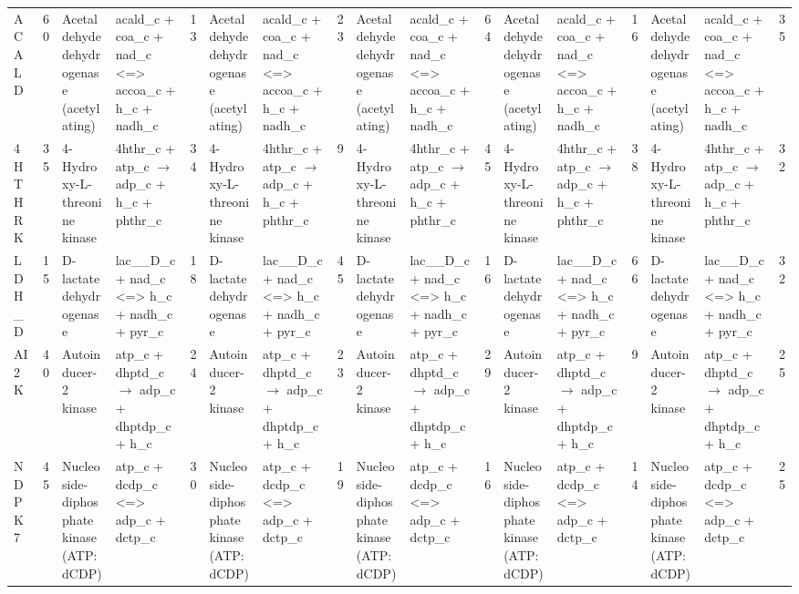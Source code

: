 \begin{tabular}{lrllrllrllrllrllr}
ACALD    & 60 &  Acetaldehyde dehydrogenase (acetylating) &  acald\_c + coa\_c + nad\_c <=> accoa\_c + h\_c + nadh\_c & 13 &  Acetaldehyde dehydrogenase (acetylating) &  acald\_c + coa\_c + nad\_c <=> accoa\_c + h\_c + nadh\_c & 23 &  Acetaldehyde dehydrogenase (acetylating) &  acald\_c + coa\_c + nad\_c <=> accoa\_c + h\_c + nadh\_c & 64 &  Acetaldehyde dehydrogenase (acetylating) &  acald\_c + coa\_c + nad\_c <=> accoa\_c + h\_c + nadh\_c & 16 &  Acetaldehyde dehydrogenase (acetylating) &  acald\_c + coa\_c + nad\_c <=> accoa\_c + h\_c + nadh\_c & 35 \\
4HTHRK   & 35 &  4-Hydroxy-L-threonine kinase &  4hthr\_c + atp\_c $\rightarrow$ adp\_c + h\_c + phthr\_c & 34 &  4-Hydroxy-L-threonine kinase &  4hthr\_c + atp\_c $\rightarrow$ adp\_c + h\_c + phthr\_c & 9 &  4-Hydroxy-L-threonine kinase &  4hthr\_c + atp\_c $\rightarrow$ adp\_c + h\_c + phthr\_c & 45 &  4-Hydroxy-L-threonine kinase &  4hthr\_c + atp\_c $\rightarrow$ adp\_c + h\_c + phthr\_c & 38 &  4-Hydroxy-L-threonine kinase &  4hthr\_c + atp\_c $\rightarrow$ adp\_c + h\_c + phthr\_c & 32 \\
LDH\_D    & 15 &  D-lactate dehydrogenase &  lac\_\_D\_c + nad\_c <=> h\_c + nadh\_c + pyr\_c & 18 &  D-lactate dehydrogenase &  lac\_\_D\_c + nad\_c <=> h\_c + nadh\_c + pyr\_c & 45 &  D-lactate dehydrogenase &  lac\_\_D\_c + nad\_c <=> h\_c + nadh\_c + pyr\_c & 16 &  D-lactate dehydrogenase &  lac\_\_D\_c + nad\_c <=> h\_c + nadh\_c + pyr\_c & 66 &  D-lactate dehydrogenase &  lac\_\_D\_c + nad\_c <=> h\_c + nadh\_c + pyr\_c & 32 \\
AI2K     & 40 &  Autoinducer-2 kinase &  atp\_c + dhptd\_c $\rightarrow$ adp\_c + dhptdp\_c + h\_c & 24 &  Autoinducer-2 kinase &  atp\_c + dhptd\_c $\rightarrow$ adp\_c + dhptdp\_c + h\_c & 23 &  Autoinducer-2 kinase &  atp\_c + dhptd\_c $\rightarrow$ adp\_c + dhptdp\_c + h\_c & 29 &  Autoinducer-2 kinase &  atp\_c + dhptd\_c $\rightarrow$ adp\_c + dhptdp\_c + h\_c & 9 &  Autoinducer-2 kinase &  atp\_c + dhptd\_c $\rightarrow$ adp\_c + dhptdp\_c + h\_c & 25 \\
NDPK7    & 45 &  Nucleoside-diphosphate kinase (ATP:dCDP) &  atp\_c + dcdp\_c <=> adp\_c + dctp\_c & 30 &  Nucleoside-diphosphate kinase (ATP:dCDP) &  atp\_c + dcdp\_c <=> adp\_c + dctp\_c & 19 &  Nucleoside-diphosphate kinase (ATP:dCDP) &  atp\_c + dcdp\_c <=> adp\_c + dctp\_c & 16 &  Nucleoside-diphosphate kinase (ATP:dCDP) &  atp\_c + dcdp\_c <=> adp\_c + dctp\_c & 14 &  Nucleoside-diphosphate kinase (ATP:dCDP) &  atp\_c + dcdp\_c <=> adp\_c + dctp\_c & 25 \\

\end{tabular}
